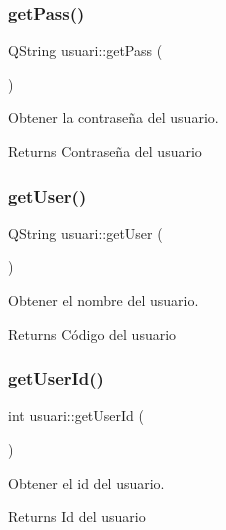 \subsubsection{\texorpdfstring{get\+Pass()}{getPass()}}
{\footnotesize\ttfamily Q\+String usuari\+::get\+Pass (\begin{DoxyParamCaption}{ }\end{DoxyParamCaption})}



Obtener la contraseña del usuario. 

\begin{DoxyReturn}{Returns}
Contraseña del usuario 
\end{DoxyReturn}
\mbox{\label{classusuari_adbe5be463437f9e51ca6f4370fa54a5b}} 
\subsubsection{\texorpdfstring{get\+User()}{getUser()}}
{\footnotesize\ttfamily Q\+String usuari\+::get\+User (\begin{DoxyParamCaption}{ }\end{DoxyParamCaption})}



Obtener el nombre del usuario. 

\begin{DoxyReturn}{Returns}
Código del usuario 
\end{DoxyReturn}
\mbox{\label{classusuari_a21ba8ae0a0d63bd1196cd62331573cde}} 
\subsubsection{\texorpdfstring{get\+User\+Id()}{getUserId()}}
{\footnotesize\ttfamily int usuari\+::get\+User\+Id (\begin{DoxyParamCaption}{ }\end{DoxyParamCaption})}



Obtener el id del usuario. 

\begin{DoxyReturn}{Returns}
Id del usuario 
\end{DoxyReturn}
\mbox{\label{classusuari_a88ddcdb51b491f7b6804980c88c753a9}} 
